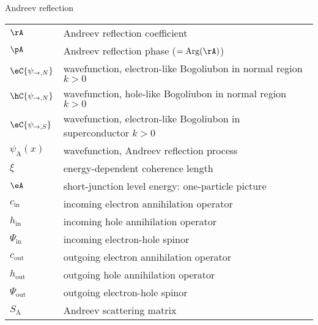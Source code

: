 {\Large\noindent Andreev reflection}
\vspace{-.2cm}
\begin{longtable}{ m{5em} m{29em}}
$\rA$ & Andreev reflection coefficient \\
$\pA$ & Andreev reflection phase ($=\mathrm{Arg}(\rA)$) \\
$\eC{\psi_{\rightarrow, N}}$ & wavefunction, electron-like Bogoliubon in normal region $k >0$\\
$\hC{\psi_{\rightarrow, N}}$ & wavefunction, hole-like Bogoliubon in normal region $k >0$\\
$\eC{\psi_{\rightarrow, S}}$ & wavefunction, electron-like Bogoliubon in superconductor $k >0$\\
$\psi_{\mathrm{A}}(x)$ & wavefunction, Andreev reflection process\\
$\xi$ & energy-dependent coherence length \\
$\eA$ & short-junction level energy: one-particle picture \\
$c_\mathrm{in}$ & incoming electron annihilation operator  \\
$h_\mathrm{in}$ & incoming hole annihilation operator  \\
$\Psi_\mathrm{in}$ & incoming electron-hole spinor \\
$c_\mathrm{out}$ & outgoing electron annihilation operator  \\
$h_\mathrm{out}$ & outgoing hole annihilation operator  \\
$\Psi_\mathrm{out}$ & outgoing electron-hole spinor \\
$S_\mathrm{A}$ & Andreev scattering matrix \\
\end{longtable}
\vspace{.2cm}

